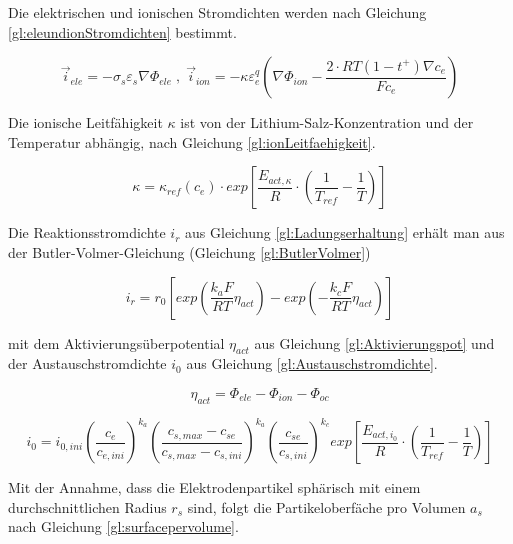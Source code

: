 Die elektrischen und ionischen Stromdichten werden nach Gleichung \ref{gl:eleundionStromdichten} bestimmt.

\begin{equation}
	\vec{i}_{ele} = - \sigma_{s} \varepsilon_{s} \nabla \Phi_{ele} \; , \; \vec{i}_{ion} = - \kappa \varepsilon^{q}_{e} \left( \nabla \Phi_{ion} - \frac{2\cdot RT (1-t^{+})\nabla c_{e}}{F c_{e}} \right) \label{gl:eleundionStromdichten}
\end{equation}

Die ionische Leitfähigkeit $\kappa$ ist von der Lithium-Salz-Konzentration und der Temperatur abhängig, nach Gleichung \ref{gl:ionLeitfaehigkeit}.

\begin{equation}
	\kappa = \kappa_{ref} (c_{e}) \cdot exp \left[ \frac{E_{act,\kappa}}{R} \cdot \left( \frac{1}{T_{ref}} - \frac{1}{T} \right) \right] \label{gl:ionLeitfaehigkeit}
\end{equation}

Die Reaktionsstromdichte $i_{r}$ aus Gleichung \ref{gl:Ladungserhaltung} erhält man aus der Butler-Volmer-Gleichung (Gleichung \ref{gl:ButlerVolmer})

\begin{equation}
	i_{r} = r_{0} \left[ exp \left( \frac{k_{a} F}{RT} \eta_{act} \right) - exp\left( -\frac{k_{c}F}{RT} \eta_{act} \right) \right] \label{gl:ButlerVolmer}
\end{equation} 

mit dem Aktivierungsüberpotential $\eta_{act}$ aus Gleichung \ref{gl:Aktivierungspot} und der Austauschstromdichte $i_{0}$ aus Gleichung \ref{gl:Austauschstromdichte}.

\begin{equation}
	\eta_{act} = \Phi_{ele} - \Phi_{ion} - \Phi_{oc} \label{gl:Aktivierungspot}
\end{equation}

\begin{equation}
	i_{0} = i_{0,ini} \left( \frac{c_{e}}{c_{e,ini}} \right)^{k_{a}} \left( \frac{c_{s,max} - c_{se}}{c_{s,max} - c_{s,ini}}\right)^{k_{a}} \left( \frac{c_{se}}{c_{s,ini}} \right)^{k_{c}} exp\left[ \frac{E_{act,i_{0}}}{R} \cdot \left( \frac{1}{T_{ref}} - \frac{1}{T}\right) \right] \label{gl:Austauschstromdichte}
\end{equation}

Mit der Annahme, dass die Elektrodenpartikel sphärisch mit einem durchschnittlichen Radius $r_{s}$ sind, folgt die Partikeloberfäche pro Volumen $a_{s}$ nach Gleichung \ref{gl:surfacepervolume}.

